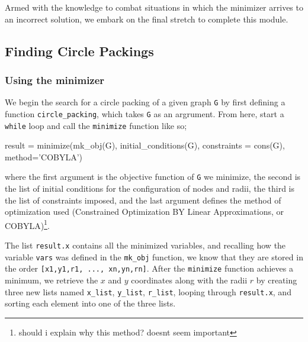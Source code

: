 \begin{flushleft}
Armed with the knowledge to combat situations in which the minimizer arrives to an incorrect solution, we embark on the final stretch to complete this module. 
\end{flushleft}

\subsection{Finding Circle Packings}

\subsubsection{Using the minimizer}

\begin{flushleft}
We begin the search for a circle packing of a given graph \texttt{G} by first defining a function \texttt{circle\_packing}, which takes \texttt{G} as an argrument. From here, start a \texttt{while} loop and call the \texttt{minimize} function like so;
\end{flushleft}

\begin{code}
    result = minimize(mk_obj(G), initial_conditions(G), 
                        constraints = cons(G), method='COBYLA')
\end{code}

\begin{flushleft}
where the first argument is the objective function of \texttt{G} we minimize, the second is the list of initial conditions for the configuration of nodes and radii, the third is the list of constraints imposed, and the last argument defines the method of optimization used (Constrained Optimization BY Linear Approximations, or COBYLA)\footnote{should i explain why this method? doesnt seem important}. 
\end{flushleft}

\begin{flushleft}
The list \texttt{result.x} contains all the minimized variables, and recalling how the variable \texttt{vars} was defined in the \texttt{mk\_obj} function, we know that they are stored in the order \texttt{[x1,y1,r1, ..., xn,yn,rn]}. After the \texttt{minimize} function achieves a minimum, we retrieve the $x$ and $y$ coordinates along with the radii $r$ by creating three new lists named \texttt{x\_list}, \texttt{y\_list}, \texttt{r\_list}, looping through \texttt{result.x}, and sorting each element into one of the three lists. 
\end{flushleft}

